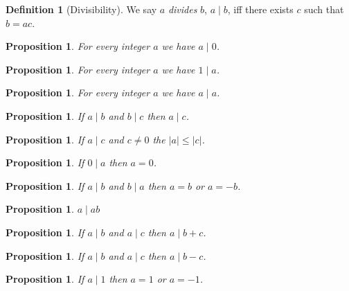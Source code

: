 \documentclass{article}
\newtheorem{proposition}[axiom]{Proposition}
\theoremstyle{definition}
\newtheorem{definition}[axiom]{Definition}
\begin{document}
    \begin{definition}[Divisibility]
        We say $a$ \emph{divides} $b$, $a \mid b$, iff there exists $c$ such that $b = ac$.
    \end{definition}

    \begin{proposition}
        For every integer $a$ we have $a \mid 0$.
    \end{proposition}

    \begin{proposition}
        For every integer $a$ we have $1 \mid a$.
    \end{proposition}

    \begin{proposition}
        For every integer $a$ we have $a \mid a$.
    \end{proposition}

    \begin{proposition}
        If $a \mid b$ and $b \mid c$ then $a \mid c$.
    \end{proposition}

    \begin{proposition}
        If $a \mid c$ and $c \neq 0$ the $|a| \leq |c|$.
    \end{proposition}

    \begin{proposition}
        If $0 \mid a$ then $a = 0$.
    \end{proposition}

    \begin{proposition}
        If $a \mid b$ and $b \mid a$ then $a = b$ or $a = -b$.
    \end{proposition}

    \begin{proposition}
        $a \mid ab$
    \end{proposition}

    \begin{proposition}
        If $a \mid b$ and $a \mid c$ then $a \mid b + c$.
    \end{proposition}

    \begin{proposition}
        If $a \mid b$ and $a \mid c$ then $a \mid b - c$.
    \end{proposition}
    
    \begin{proposition}
        If $a \mid 1$ then $a = 1$ or $a = -1$.
    \end{proposition}
\end{document}

